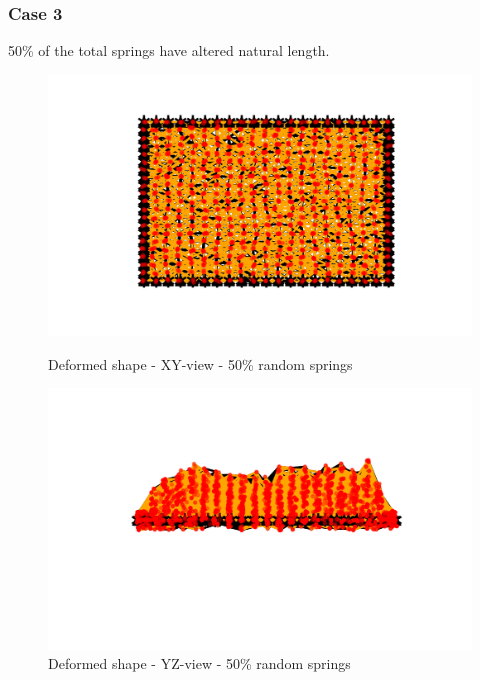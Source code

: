 \subsubsection{Case 3}
50\% of the total springs have altered natural length.
\begin{figure}[!htbp]
\begin{minipage}{0.3\textwidth}
    \centering
    \includegraphics[width = 1\textwidth]{Figures/rand_50_XY.png}
    \caption{Deformed shape - XY-view - 50\% random springs}
    \label{fig:rand_50_xy}
\end{minipage}
\hspace{5mm}
\begin{minipage}{0.3\textwidth}
    \centering
    \includegraphics[width = 1\textwidth]{Figures/rand_50_YZ.png}
    \caption{Deformed shape - YZ-view - 50\% random springs}
    \label{fig:rand_50_yz}
\end{minipage}
\hspace{5mm}
\begin{minipage}{0.3\textwidth}

\end{minipage}
\end{figure}
